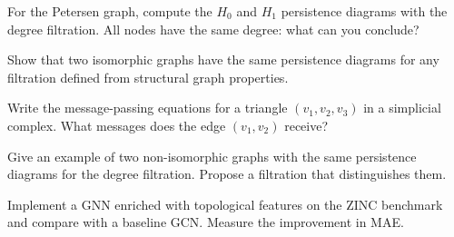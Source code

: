\begin{exercise}
For the Petersen graph, compute the $H_0$ and $H_1$ persistence
diagrams with the degree filtration. All nodes have the same degree:
what can you conclude?
\end{exercise}

\begin{exercise}
Show that two isomorphic graphs have the same persistence diagrams
for any filtration defined from structural graph properties.
\end{exercise}

\begin{exercise}
Write the message-passing equations for a triangle $(v_1, v_2, v_3)$
in a simplicial complex. What messages does the edge $(v_1, v_2)$
receive?
\end{exercise}

\begin{exercise}
Give an example of two non-isomorphic graphs with the same
persistence diagrams for the degree filtration. Propose a filtration
that distinguishes them.
\end{exercise}

\begin{exercise}[Project]
Implement a GNN enriched with topological features on the ZINC
benchmark and compare with a baseline GCN. Measure the improvement
in MAE.
\end{exercise}

